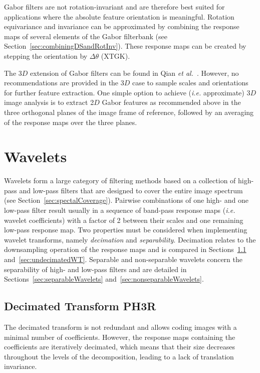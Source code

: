 \documentclass[fleqn,a4paper,oneside,openany]{book}
\newcommand\id[1]{{\hfill\normalsize{\idfont #1}}}
\newcommand\textid[1]{{\normalsize{\idfont #1}}}
\begin{document}
Gabor filters are not rotation-invariant and are therefore best suited for applications where the absolute feature orientation is meaningful.
Rotation equivariance and invariance can be approximated by combining the response maps of several elements of the Gabor filterbank (see Section~\ref{sec:combiningDSandRotInv}). These response maps can be created by stepping the orientation by \(\Delta \theta\) (\textid{XTGK}).

The 3$D$ extension of Gabor filters can be found in Qian \textit{et al.}~\cite{Qian2006}. However, no recommendations are provided in the 3$D$ case to sample scales and orientations for further feature extraction.
One simple option to achieve (\textit{i.e.} approximate) 3$D$ image analysis is to extract 2$D$ Gabor features as recommended above in the three orthogonal planes  of the image frame of reference, followed by an averaging of the response maps over the three planes.
%
\section{Wavelets}\label{sec:wavelets}
%
Wavelets form a large category of filtering methods based on a collection of high-pass and low-pass filters that are designed to cover the entire image spectrum~\cite{Mallat1989} (see Section~\ref{sec:spectalCoverage}).
Pairwise combinations of one high- and one low-pass filter result usually in a sequence of band-pass response maps (\textit{i.e.} wavelet coefficients) with a factor of 2 between their scales and one remaining low-pass response map.
Two properties must be considered when implementing wavelet transforms, namely \emph{decimation} and \emph{separability}.
Decimation relates to the downsampling operation of the response maps and is compared in Sections~\ref{sec:decimatedWT} and~\ref{sec:undecimatedWT}.
Separable and non-separable wavelets concern the separability of high- and low-pass filters and are detailed in Sections~\ref{sec:separableWavelets} and~\ref{sec:nonseparableWavelets}.
%
\subsection[Decimated Transform]{Decimated Transform \id{PH3R}}\label{sec:decimatedWT}
%
The decimated transform is not redundant and allows coding images with a minimal number of coefficients.
However, the response maps containing the coefficients are iteratively decimated, which means that their size decreases throughout the levels of the decomposition, leading to a lack of translation invariance.
\end{document}
